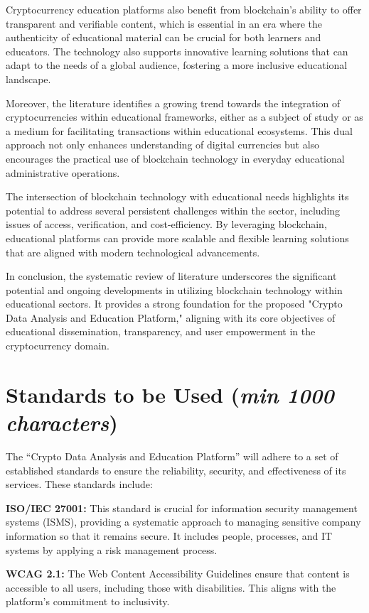 \documentclass[12pt]{report}
\newcommand{\characters}[1]{(\textit{min #1 characters})}
\begin{document}
Cryptocurrency education platforms also benefit from blockchain's ability to offer transparent and verifiable content, which is essential in an era where the authenticity of educational material can be crucial for both learners and educators. The technology also supports innovative learning solutions that can adapt to the needs of a global audience, fostering a more inclusive educational landscape.

Moreover, the literature identifies a growing trend towards the integration of cryptocurrencies within educational frameworks, either as a subject of study or as a medium for facilitating transactions within educational ecosystems. This dual approach not only enhances understanding of digital currencies but also encourages the practical use of blockchain technology in everyday educational administrative operations.

The intersection of blockchain technology with educational needs highlights its potential to address several persistent challenges within the sector, including issues of access, verification, and cost-efficiency. By leveraging blockchain, educational platforms can provide more scalable and flexible learning solutions that are aligned with modern technological advancements.

In conclusion, the systematic review of literature underscores the significant potential and ongoing developments in utilizing blockchain technology within educational sectors. It provides a strong foundation for the proposed "Crypto Data Analysis and Education Platform," aligning with its core objectives of educational dissemination, transparency, and user empowerment in the cryptocurrency domain.

\section{Standards to be Used \characters{1000}}
The ``Crypto Data Analysis and Education Platform'' will adhere to a set of established standards to ensure the reliability, security, and effectiveness of its services. These standards include:

\textbf{ISO/IEC 27001:} This standard is crucial for information security management systems (ISMS), providing a systematic approach to managing sensitive company information so that it remains secure. It includes people, processes, and IT systems by applying a risk management process.

\textbf{WCAG 2.1:} The Web Content Accessibility Guidelines ensure that content is accessible to all users, including those with disabilities. This aligns with the platform's commitment to inclusivity.
\end{document}
